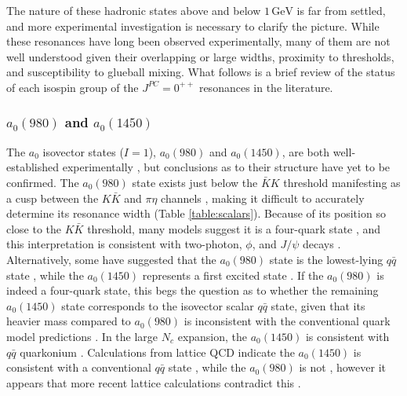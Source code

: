 \documentclass[aps,prd,onecolumn,showpacs,amsmath,amssymb,nofootinbib]{revtex4} \pdfoutput=1
\newcommand{\gev}{\mathrm{GeV}}
\begin{document}
The nature of these hadronic states above and below $1\,\gev$ is far from settled, and more experimental investigation is necessary to clarify the picture. While these resonances have long been observed experimentally, many of them are not well understood given their overlapping or large widths, proximity to thresholds, and susceptibility to glueball mixing. What follows is a brief review of the status of each isospin group of the $J^{PC}=0^{++}$ resonances in the literature. 

\subsubsection{$a_{0}(980)$ and $a_{0}(1450)$}
The $a_0$ isovector states ($I=1$), $a_{0}(980)$ and $a_{0}(1450)$, are both well-established experimentally \cite{Abele1998}, but conclusions as to their structure have yet to be confirmed. The $a_{0}(980)$ state exists just below the $\bar K K$ threshold manifesting as a cusp between the $K\bar K$ and $\pi \eta$ channels \cite{Uehara2002}, making it difficult to accurately determine its resonance width (Table \ref{table:scalars}). Because of its position so close to the $K \bar K$ threshold, many models suggest it is a four-quark state \cite{Jaffe1977,Liu1981,Giacosa2008,Achasov2010,Zhang2011}, and this interpretation is consistent with two-photon, $\phi$, and $J/\psi$ decays \cite{Barnes1985, Achasov2006}. Alternatively, some have suggested that the $a_0(980)$ state is the lowest-lying $q\bar q$ state \cite{Narison2000,Zhang2011}, while the $a_0(1450)$ represents a first excited state \cite{Zhang2011}. If the $a_0(980)$ is indeed a four-quark state, this begs the question as to whether the remaining $a_{0}(1450)$ state corresponds to the isovector scalar $q\bar q$ state, given that its heavier mass compared to $a_{0}(980)$ is inconsistent with the conventional quark model predictions \cite{Pelaez2011} . In the large $N_c$ expansion, the $a_0(1450)$ is consistent with $q\bar q$ quarkonium \cite{Giacosa2008}. Calculations from lattice QCD indicate the $a_0(1450)$ is consistent with a conventional $q\bar{q}$ state \cite{Mathur2007}, while the $a_0(980)$ is not \cite{McNeile2006,Mathur2007}, however it appears that more recent lattice calculations contradict this \cite{Alexandrou2013,Wagner2013}. 
\end{document}
